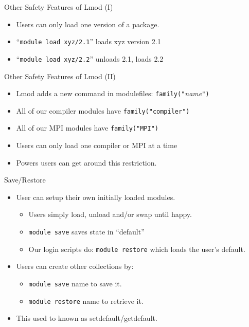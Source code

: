 \documentclass{beamer}
\begin{document}
\begin{frame}{Other Safety Features of Lmod (I)}
  \begin{itemize}
    \item Users can only load one version of a package.
    \item ``\texttt{module load xyz/2.1}'' loads xyz version 2.1
    \item ``\texttt{module load xyz/2.2}'' unloads 2.1, loads 2.2
  \end{itemize}
\end{frame}

\begin{frame}{Other Safety Features of Lmod (II)}
  \begin{itemize}
    \item Lmod adds a new command in modulefiles: \texttt{family("}\emph{name}\texttt{")}
    \item All of our compiler modules have \texttt{family("compiler")}
    \item All of our MPI modules have \texttt{family("MPI")}
    \item Users can only load one compiler or MPI at a time
    \item Powers users can get around this restriction.
  \end{itemize}
\end{frame}

\begin{frame}{Save/Restore}
  \begin{itemize}
    \item User can setup their own initially loaded modules.
      \begin{itemize}
        \item Users simply load, unload and/or swap until happy.
        \item {\color{blue}\texttt{module save}} saves state in ``default''
        \item Our login scripts do: {\color{blue}\texttt{module restore}}
          which loads the user's default.
      \end{itemize}
    \item Users can create other collections by:
      \begin{itemize}
        \item {\color{blue}\texttt{module save}
            {\color{violet}name}} to save it.
        \item {\color{blue}\texttt{module restore}
            {\color{violet}name}} to retrieve it.
      \end{itemize}
    \item This used to known as setdefault/getdefault.
  \end{itemize}
\end{frame}
\end{document}
